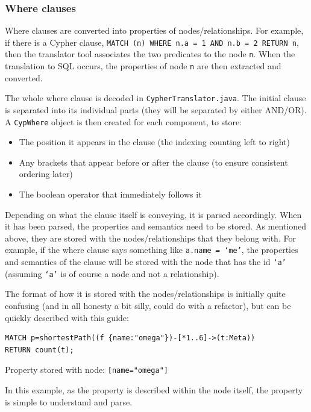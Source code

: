 \documentclass[letterpaper]{ltxdoc}
\begin{document}
\subsubsection{Where clauses}
Where clauses are converted into properties of nodes/relationships. For example, if there is a Cypher clause, \texttt{MATCH (n) WHERE n.a = 1 AND n.b = 2 RETURN n}, then the translator tool associates the two predicates to the node \texttt{n}. When the translation to SQL occurs, the properties of node \texttt{n} are then extracted and converted.

The whole where clause is decoded in \texttt{CypherTranslator.java}. The initial clause is separated into its individual parts (they will be separated by either AND/OR). A \texttt{CypWhere} object is then created for each component, to store:

\begin{itemize}
\item The position it appears in the clause (the indexing counting left to right)
\item Any brackets that appear before or after the clause (to ensure consistent ordering later)
\item The boolean operator that immediately follows it
\end{itemize}

Depending on what the clause itself is conveying, it is parsed accordingly. When it has been parsed, the properties and semantics need to be stored. As mentioned above, they are stored with the nodes/relationships that they belong with. For example, if the where clause says something like \texttt{a.name = `me'}, the properties and semantics of the clause will be stored with the node that has the id \texttt{`a'} (assuming \texttt{`a'} is of course a node and not a relationship).

The format of how it is stored with the nodes/relationships is initially quite confusing (and in all honesty a bit silly, could do with a refactor), but can be quickly described with this guide:

\bigskip

\begin{lstlisting}[language=Cypher]
MATCH p=shortestPath((f {name:"omega"})-[*1..6]->(t:Meta))
RETURN count(t);
\end{lstlisting}

Property stored with node: \texttt{[name="omega"]}

In this example, as the property is described within the node itself, the property is simple to understand and parse.
\end{document}
